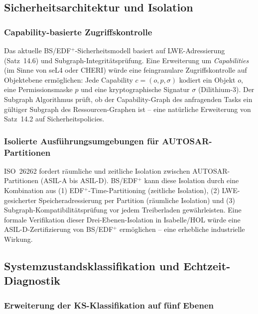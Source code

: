 ﻿\documentclass[a4paper,12pt]{scrreprt}
\theoremstyle{definition}
\begin{document}
	\subsection{Sicherheitsarchitektur und Isolation}
	
	\subsubsection{Capability-basierte Zugriffskontrolle}
	
	Das aktuelle BS/EDF$^+$-Sicherheitsmodell basiert auf LWE-Adressierung
	(Satz~14.6) und Subgraph-Integritätsprüfung. Eine Erweiterung um
	\emph{Capabilities} (im Sinne von seL4 oder CHERI) würde eine
	fein\-granulare Zugriffskontrolle auf Objekt\-ebene ermöglichen:
	Jede Capability $c = (o, p, \sigma)$ kodiert ein Objekt $o$,
	eine Permissionsmaske $p$ und eine kryptographische Signatur $\sigma$
	(Dilithium-3). Der Subgraph Algorithmus prüft, ob der Capability-Graph
	des anfragenden Tasks ein gültiger Subgraph des Ressourcen-Graphen ist --
	eine natürliche Erweiterung von Satz~14.2 auf Sicherheitspolicies.
	
	\subsubsection{Isolierte Ausführungsumgebungen für AUTOSAR-Partitionen}
	
	ISO~26262 \cite{ISO26262} fordert räumliche und zeitliche
	Isolation zwischen AUTOSAR-Partitionen (ASIL-A bis ASIL-D).
	BS/EDF$^+$ kann diese Isolation durch eine Kombination aus
	(1) EDF$^+$-Time-Partitioning (zeitliche Isolation),
	(2) LWE-gesicherter Speicheradressierung per Partition (räumliche Isolation)
	und (3) Subgraph-Kompatibilitätsprüfung vor jedem Treiberladen gewährleisten.
	Eine formale Verifikation dieser Drei-Ebenen-Isolation in Isabelle/HOL
	würde eine ASIL-D-Zertifizierung von BS/EDF$^+$ ermöglichen --
	eine erhebliche industrielle Wirkung.
	
	\subsection{Systemzustandsklassifikation und Echtzeit-Diagnostik}
	
	\subsubsection{Erweiterung der KS-Klassifikation auf fünf Ebenen}
	
\end{document}
